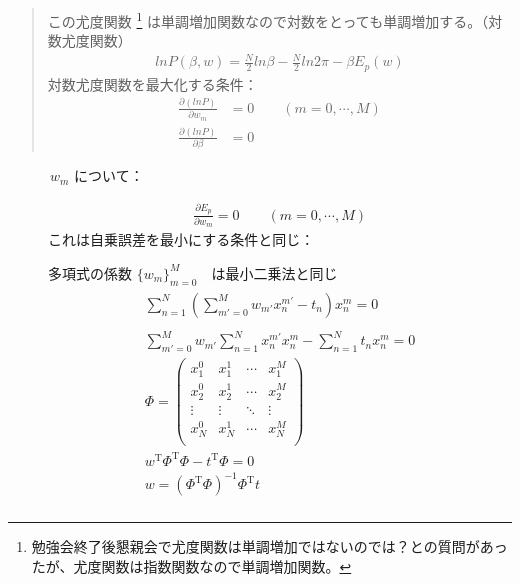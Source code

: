 \documentclass[letterpaper,10pt,dvipdfmx]{sphinxmanual}
\begin{document}
\begin{quote}
この尤度関数 \footnote[1]{\sphinxAtStartFootnote%
勉強会終了後懇親会で尤度関数は単調増加ではないのでは？との質問があったが、尤度関数は指数関数なので単調増加関数。
} は単調増加関数なので対数をとっても単調増加する。（対数尤度関数）
\begin{equation*}
\begin{split}ln P(\beta,w) = \frac{N}{2}ln \beta - \frac{N}{2} ln 2 \pi - \beta E_p(w)\end{split}
\end{equation*}
対数尤度関数を最大化する条件：
\begin{equation*}
\begin{split}\frac{\partial (ln P)}{\partial w_m} &= 0  \qquad       (m = 0, \cdots, M) \\
\frac{\partial (ln P)}{\partial \beta} &= 0\end{split}
\end{equation*}\end{quote}
\begin{description}
\item[{　　　\(w_m\) について：}] \leavevmode\begin{equation*}
\begin{split}\frac{\partial E_p}{\partial w_m} = 0 \qquad (m =0, \cdots,M)\end{split}
\end{equation*}
これは自乗誤差を最小にする条件と同じ：

多項式の係数 \(\{w_m\}_{m=0}^{M}\)　は最小二乗法と同じ
\begin{align*}\!\begin{aligned}
\sum_{n=1}^{N} \left ( \sum_{m'=0}^{M} w_{m'} x_n^{m'} -t_n \right ) x_n^m = 0 \\\\
\sum_{m'=0}^{M} w_{m'} \sum_{n=1}^{N} x_n^{m'} x_{n}^{m} - \sum_{n=1}^{N} t_n x_n^m = 0\\
\Phi = \left ( \begin{array}{llll}
         x_1^0 & x_1^1 & \cdots & x_1^M \\
         x_2^0 & x_2^1 & \cdots & x_2^M \\
         \vdots & \vdots & \ddots & \vdots \\
          x_N^0 & x_N^1 & \cdots & x_N^M \\
          \end{array} \right )\\
w^{\mathrm{T}} \Phi^{\mathrm{T}} \Phi - t^{\mathrm{T}} \Phi = 0\\
w = (\Phi^{\mathrm{T}} \Phi)^{-1} \Phi^{\mathrm{T}} t\\
\end{aligned}\end{align*}
\end{description}
\end{document}
